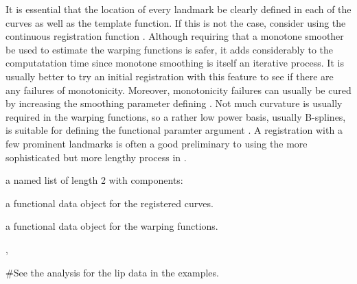 \begin{Details}\relax
It is essential that the location of every landmark be clearly defined
in each of the curves as well as the template function.  If this is
not the case, consider using the continuous registration function
.  Although requiring that a monotone smoother be
used to estimate the warping functions is safer, it adds considerably
to the computatation time since monotone smoothing is itself an
iterative process.  It is usually better to try an initial
registration with this feature to see if there are any failures of
monotonicity.  Moreover, monotonicity failures can usually be cured
by increasing the smoothing parameter defining .  Not
much curvature is usually required in the warping functions, so a
rather low power basis, usually B-splines, is suitable for defining
the functional paramter argument .  A registration with
a few prominent landmarks is often a good preliminary to using the
more sophisticated but more lengthy process in .
\end{Details}
\begin{Value}
a named list of length 2 with components:

\begin{ldescription}
\item[\code{fdreg}] a functional data object for the registered curves.

\item[\code{warpfd}] a functional data object for the warping functions.

\end{ldescription}
\end{Value}
\begin{SeeAlso}\relax
{},
\end{SeeAlso}
\begin{Examples}
\begin{ExampleCode}
#See the analysis for the lip data in the examples.
\end{ExampleCode}
\end{Examples}

